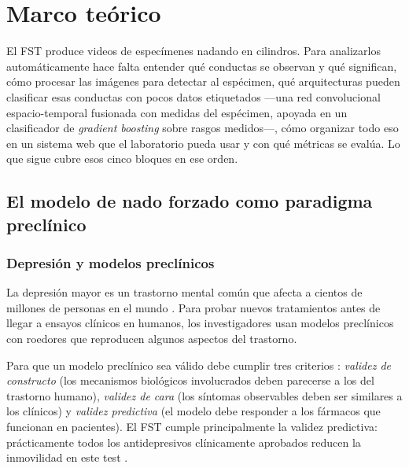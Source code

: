 
\chapter{Marco teórico}

El FST produce videos de especímenes nadando en cilindros. Para analizarlos
automáticamente hace falta entender qué conductas se observan y qué
significan, cómo procesar las imágenes para detectar al espécimen, qué
arquitecturas pueden clasificar esas conductas con pocos datos etiquetados
---una red convolucional espacio-temporal fusionada con medidas del espécimen, apoyada
en un clasificador de \textit{gradient boosting} sobre
rasgos medidos---, cómo organizar todo eso
en un sistema web que el laboratorio pueda usar y con qué métricas se evalúa.
Lo que sigue cubre esos cinco bloques en ese orden.

\section{El modelo de nado forzado como paradigma preclínico}

\subsection{Depresión y modelos preclínicos}

La depresión mayor es un trastorno mental común que afecta a cientos de millones de
personas en el mundo \cite{who_depression_2025}. Para probar nuevos
tratamientos antes de llegar a ensayos clínicos en humanos, los investigadores usan
modelos preclínicos con roedores que reproducen algunos aspectos del trastorno.

Para que un modelo preclínico sea válido debe cumplir tres criterios \cite{slattery2012}:
\textit{validez de constructo} (los mecanismos biológicos involucrados deben parecerse
a los del trastorno humano), \textit{validez de cara} (los síntomas observables deben
ser similares a los clínicos) y \textit{validez predictiva} (el modelo debe responder a
los fármacos que funcionan en pacientes). El FST cumple principalmente la validez
predictiva: prácticamente todos los antidepresivos clínicamente aprobados reducen la
inmovilidad en este test \cite{slattery2012}.

